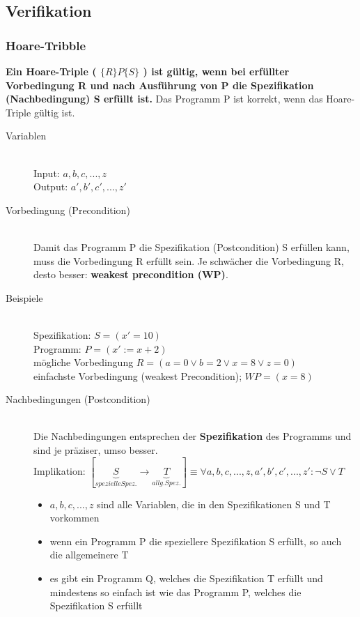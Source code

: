 \documentclass[a4paper,10pt]{article}
\newcommand{\Bold}[1]{\textbf{#1}} %
\newcommand{\ra}{\rightarrow}
\begin{document}
\subsection{Verifikation}
\subsubsection{Hoare-Tribble}
\Bold {Ein Hoare-Triple ( $\{ R \} P \{ S \}$ ) ist g\"ultig, wenn bei erf\"ullter Vorbedingung R und nach Ausf\"uhrung von P die Spezifikation (Nachbedingung) S erf\"ullt ist.} Das Programm P ist korrekt, wenn das Hoare-Triple g\"ultig ist.
\begin{description}
	\item[Variablen] \hfill \\
		Input: $a, b, c, ..., z$ \\
		Output: $a', b', c', ..., z'$
	\item[Vorbedingung (Precondition)] \hfill \\
		Damit das Programm P die Spezifikation (Postcondition) S erf\"ullen kann, muss die Vorbedingung R erf\"ullt sein. Je schw\"acher die Vorbedingung R, desto besser: \Bold {weakest precondition (WP)}.
	\item[Beispiele] \hfill \\
		Spezifikation: $S = (x' = 10)$ \\
		Programm: $P = (x' := x + 2)$ \\
		m\"ogliche Vorbedingung $R = (a = 0 \vee b = 2 \vee x = 8 \vee z = 0)$ \\
		einfachste Vorbedingung (weakest Precondition);  $WP = (x = 8)$
	\item[Nachbedingungen (Postcondition)] \hfill \\
		Die Nachbedingungen entsprechen der \Bold {Spezifikation} des Programms und sind je pr\"aziser, umso besser. \\
		Implikation: $[\underbrace{S}_{spezielle Spez.} \ra \underbrace{T}_{allg. Spez.}] \equiv \forall a, b, c, ..., z, a', b', c', ..., z': \neg S \vee T$
		\begin{itemize}
			\item $a, b, c, ..., z$ sind alle Variablen, die in den Spezifikationen S und T vorkommen
			\item wenn ein Programm P die speziellere Spezifikation S erf\"ullt, so auch die allgemeinere T
			\item es gibt ein Programm Q, welches die Spezifikation T erf\"ullt und mindestens so einfach ist wie das Programm P, welches die Spezifikation S erf\"ullt

\end{itemize}
\end{description}
\end{document}
